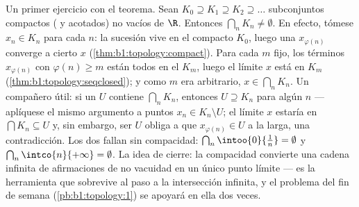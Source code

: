 \begin{example}\label{ex:b1:topology:nested}
Un primer ejercicio con el teorema. Sean
$K_0 \supseteq K_1 \supseteq K_2 \supseteq \dots$ subconjuntos
compactos ( y acotados) no vacíos de $\R$. Entonces
$\bigcap_n K_n \neq \emptyset$. En efecto, tómese $x_n \in K_n$ para
cada $n$: la sucesión vive en el compacto $K_0$, luego una
 $x_{\varphi(n)}$ converge a cierto $x$
(\cref{thm:b1:topology:compact}). Para cada $m$ fijo, los términos
$x_{\varphi(n)}$ con $\varphi(n) \geq m$ están todos en el 
$K_m$, luego el límite $x$ está en $K_m$
(\cref{thm:b1:topology:seqclosed}); y como $m$ era arbitrario,
$x \in \bigcap_n K_n$. Un compañero útil: si un  $U$ contiene
$\bigcap_n K_n$, entonces $U \supseteq K_n$ para algún $n$ ---
aplíquese el mismo argumento a puntos $x_n \in K_n \setminus U$; el
límite $x$ estaría en $\bigcap K_n \subseteq U$ y, sin embargo, ser
$U$  obliga a que $x_{\varphi(n)} \in U$ a la larga, una
contradicción. Los dos  fallan sin compacidad:
$\bigcap_n \intoo{0}{\frac 1n} = \emptyset$ y
$\bigcap_n \intco{n}{+\infty} = \emptyset$. La idea de cierre: la
compacidad convierte una cadena infinita de afirmaciones de no
vacuidad en un único punto límite --- es la herramienta que sobrevive
al paso a la intersección infinita, y el problema del fin de semana
(\cref{pb:b1:topology:1}) se apoyará en ella dos veces.
\end{example}

